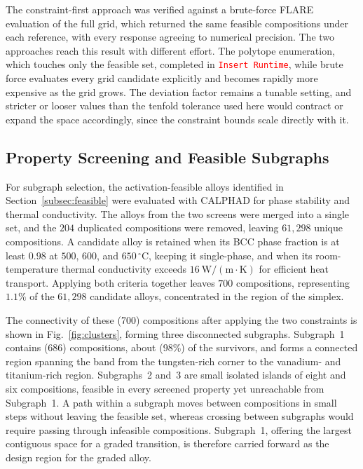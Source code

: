 The constraint-first approach was verified against a brute-force FLARE
evaluation of the full grid, which returned the same feasible compositions
under each reference, with every response agreeing to numerical precision.
The two approaches reach this result with different effort. The polytope
enumeration, which touches only the feasible set, completed in
\textcolor{red}{\texttt{Insert Runtime}}, while brute force evaluates every
grid candidate explicitly and becomes rapidly more expensive as the grid
grows. The deviation factor remains a tunable setting, and stricter or looser
values than the tenfold tolerance used here would contract or expand the
space accordingly, since the constraint bounds scale directly with it.


\subsection{Property Screening and Feasible Subgraphs}
\label{subsec:subgraphs}

For subgraph selection, the activation-feasible alloys identified in
Section~\ref{subsec:feasible} were evaluated with CALPHAD for phase stability and thermal
conductivity. The alloys from the two screens were merged into a single set, and
the \(204\) duplicated compositions were removed, leaving \(61{,}298\)
unique compositions. A candidate alloy is retained when its BCC phase fraction is at least $0.98$ at $500$, $600$, and $650\,^{\circ}\mathrm{C}$, keeping it single-phase, and when its room-temperature thermal conductivity exceeds $16~\mathrm{W/(m\cdot K)}$ for efficient heat transport. Applying both criteria together leaves $700$ compositions, representing $1.1\%$ of the $61{,}298$ candidate alloys, concentrated in the  region of the simplex.


The connectivity of these (700) compositions after applying the two constraints is shown in Fig.~\ref{fig:clusters}, forming three disconnected subgraphs. Subgraph~1 contains (686) compositions, about (98\%) of the survivors, and forms a connected region spanning the  band from the tungsten-rich corner to the vanadium- and titanium-rich region. Subgraphs~2 and~3 are small isolated islands of eight and six compositions, feasible in every screened property yet unreachable from Subgraph~1. A path within a subgraph moves between compositions in small steps without leaving the feasible set, whereas crossing between subgraphs would require passing through infeasible compositions. Subgraph~1, offering the largest contiguous space for a graded transition, is therefore carried forward as the design region for the graded alloy.


